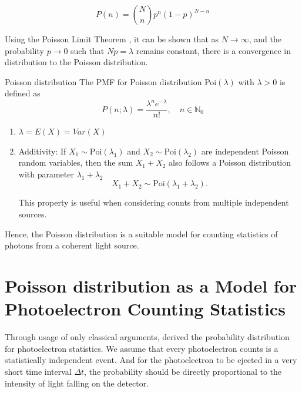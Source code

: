 \begin{equation}
    P(n) = \binom{N}{n} p^n (1 - p)^{N - n}
\end{equation}

Using the Poisson Limit Theorem \cite{fellerIntroductionProbabilityTheory1968}, it can be shown that as $N \to \infty$, and the probability $p \to 0$ such that $Np = \lambda$ remains constant, there is a convergence in distribution to the Poisson distribution.

\begin{note}
    {Poisson distribution}
    The \gls{PMF} for Poisson distribution Poi\((\lambda)\) with \(\lambda > 0\) is defined as
    \begin{equation}
        P(n;\lambda) = \frac{\lambda^n e^{-\lambda}}{n!}, \quad n \in \mathbb{N}_0
    \end{equation}
    \begin{enumerate}
        \item $\lambda = E(X) = Var(X)$ 
        \item Additivity: If $X_1 \sim \text{Poi}(\lambda_1)$ and $X_2 \sim \text{Poi}(\lambda_2)$ are independent Poisson random variables, then the sum $X_1 + X_2$ also follows a Poisson distribution with parameter $\lambda_1 + \lambda_2$
        \begin{equation}
            X_1 + X_2 \sim \text{Poi}(\lambda_1 + \lambda_2).
        \end{equation}
        
        This property is useful when considering counts from multiple independent sources.
    \end{enumerate}
\end{note}

Hence, the Poisson distribution is a suitable model for counting statistics of photons from a coherent light source.

\section{Poisson distribution as a Model for Photoelectron Counting Statistics}\label{section:photoelectron-counting-stats}

Through usage of only classical arguments, \citeauthor{mandelFluctuationsPhotonBeams1958} \cite{mandelFluctuationsPhotonBeams1958,mandelFluctuationsPhotonBeams1959} derived the probability distribution for photoelectron statistics. We assume that every photoelectron counts is a statistically independent event. And for the photoelectron to be ejected in a very short time interval $\Delta t$, the probability should be directly proportional to the intensity of light falling on the detector.

